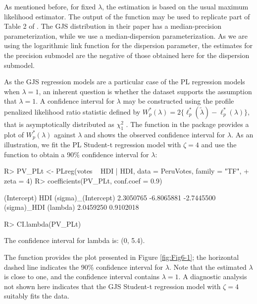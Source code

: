 As mentioned before, for fixed $\lambda$, the estimation is based on the usual maximum likelihood estimator. The output of the  function may be used to replicate part of Table 2 of \cite{LemonteBazan2016}. The GJS distribution in their paper has a median-precision parameterization, while we use a median-dispersion parameterization. As we are using the logarithmic link function for the dispersion parameter, the estimates for the precision submodel are the negative of those obtained here for the dispersion submodel. 

As the GJS regression models are a particular case of the PL regression models when $\lambda = 1$, an inherent question is whether the dataset supports the assumption that $\lambda =1$. A confidence interval for $\lambda$ may be constructed using the profile penalized likelihood ratio statistic defined by $W_p^*(\lambda) = 2 \{ \ell_p^*(\widetilde{\lambda}) - \ell_p^*(\lambda) \}$, that is asymptotically distributed as $\chi_{1}^2$ \citep{QueirozFerrari2023}. The  function in the  package provides a plot of $W_p^*(\lambda)$ against $\lambda$ and shows the observed confidence interval for $\lambda$. As an illustration, we fit the PL Student-t regression model with $\zeta=4$ and use the  function to obtain a 90\% confidence interval for $\lambda$:

\begin{Schunk}
\begin{Sinput}
R> PV_PLt <- PLreg(votes ~ HDI | HDI, data = PeruVotes, family = "TF",
+                  zeta = 4)
R> coefficients(PV_PLt, conf.coef = 0.9)
\end{Sinput}
\begin{Soutput}
        (Intercept)                 HDI (sigma)_(Intercept) 
          2.3050765          -6.8065881          -2.7445500 
        (sigma)_HDI            (lambda) 
          2.0459250           0.9102018 
\end{Soutput}
\begin{Sinput}
R> CI.lambda(PV_PLt)
\end{Sinput}
\begin{Soutput}
The confidence interval for lambda is: (0, 5.4).
\end{Soutput}
\end{Schunk}

The  function provides the plot presented in Figure \ref{fig:Fig6-1}; the horizontal dashed line indicates the 90\% confidence interval for $\lambda$. Note that the estimated $\lambda$ is close to one, and the confidence interval contains $\lambda=1$. A diagnostic analysis not shown here indicates that the GJS Student-t regression model with $\zeta = 4$ suitably fits the data.


